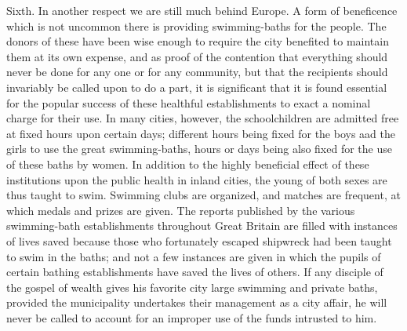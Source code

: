 \documentclass[11pt,openany]{book}
\begin{document}
Sixth. In another respect we are still much behind Europe. A form of beneficence which is not uncommon there is providing swimming-baths for the people. The donors of these have been wise enough to require the city benefited to maintain them at its own expense, and as proof of the contention that everything should never be done for any one or for any community, but that the recipients should invariably be called upon to do a part, it is significant that it is found essential for the popular success of these healthful establishments to exact a nominal charge for their use. In many cities, however, the schoolchildren are admitted free at fixed hours upon certain days; different hours being fixed for the boys aad the girls to use the great swimming-baths, hours or days being also fixed for the use of these baths by women. In addition to the highly beneficial effect of these institutions upon the public health in inland cities, the young of both sexes are thus taught to swim. Swimming clubs are organized, and matches are frequent, at which medals and prizes are given. The reports published by the various swimming-bath establishments throughout Great Britain are filled with instances of lives saved because those who fortunately escaped shipwreck had been taught to swim in the baths; and not a few instances are given in which the pupils of certain bathing establishments have saved the lives of others. If any disciple of the gospel of wealth gives his favorite city large swimming and private baths, provided the municipality undertakes their management as a city affair, he will never be called to account for an improper use of the funds intrusted to him.
\end{document}
